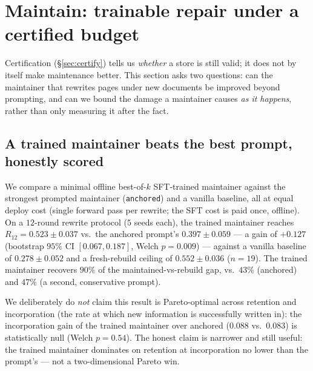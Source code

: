 \section{Maintain: trainable repair under a certified budget}
\label{sec:maintain}

Certification (\S\ref{sec:certify}) tells us \emph{whether} a store is still valid; it does not by itself make maintenance better. This section asks two questions: can the maintainer that rewrites pages under new documents be improved beyond prompting, and can we bound the damage a maintainer causes \emph{as it happens}, rather than only measuring it after the fact.

\subsection{A trained maintainer beats the best prompt, honestly scored}

We compare a minimal offline best-of-$k$ SFT-trained maintainer against the strongest prompted maintainer (\texttt{anchored}) and a vanilla baseline, all at equal deploy cost (single forward pass per rewrite; the SFT cost is paid once, offline). On a $12$-round rewrite protocol ($5$ seeds each), the trained maintainer reaches $R_{12} = 0.523 \pm 0.037$ vs.\ the anchored prompt's $0.397 \pm 0.059$ --- a gain of $+0.127$ (bootstrap $95\%$ CI $[0.067, 0.187]$, Welch $p{=}0.009$) --- against a vanilla baseline of $0.278 \pm 0.052$ and a fresh-rebuild ceiling of $0.552 \pm 0.036$ ($n{=}19$). The trained maintainer recovers $90\%$ of the maintained-vs-rebuild gap, vs.\ $43\%$ (anchored) and $47\%$ (a second, conservative prompt).

We deliberately do \emph{not} claim this result is Pareto-optimal across retention and incorporation (the rate at which new information is successfully written in): the incorporation gain of the trained maintainer over anchored ($0.088$ vs.\ $0.083$) is statistically null (Welch $p{=}0.54$). The honest claim is narrower and still useful: the trained maintainer dominates on retention at incorporation no lower than the prompt's --- not a two-dimensional Pareto win.

